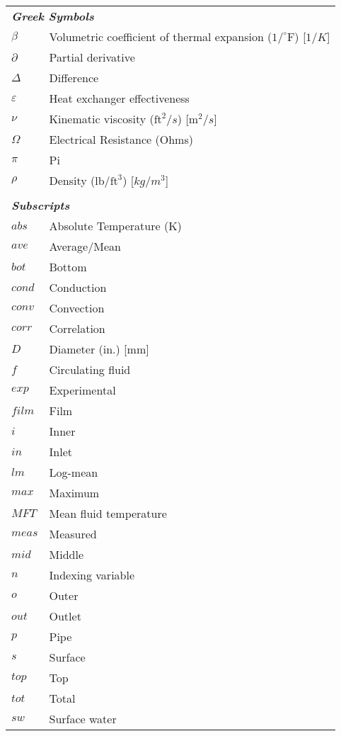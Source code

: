 \begin{nomenclature}
\begin{tabular}{p{2cm} p{12cm}}
		\multicolumn{2}{l}{\textbf{\textit{Greek Symbols}}} \\
		$\beta$ \dotfill & Volumetric coefficient of thermal expansion ($1/^\circ \mbox{F}$) [$1/K$]\\
		$\partial$ \dotfill & Partial derivative \\
		$\Delta$ \dotfill & Difference \\
		$\varepsilon$ \dotfill & Heat exchanger effectiveness \\
		$\nu$ \dotfill & Kinematic viscosity ($\mbox{ft}^2/s$) [$\mbox{m}^2/s$]\\
		$\Omega$ \dotfill & Electrical Resistance (Ohms)\\
		$\pi$ \dotfill & Pi \\
		$\rho$ \dotfill & Density (lb/$\mbox{ft}^3$) [$kg/m^3$]\\
		& \\
		\multicolumn{2}{l}{\textbf{\textit{Subscripts}}} \\
		$abs$ \dotfill & Absolute Temperature (K)\\
		$ave$ \dotfill & Average/Mean \\
		$bot$ \dotfill & Bottom \\
		$cond$ \dotfill & Conduction \\
		$conv$ \dotfill & Convection \\
		$corr$ \dotfill & Correlation \\
		$D$ \dotfill & Diameter (in.) [mm] \\
		$f$ \dotfill & Circulating fluid \\
		$exp$ \dotfill & Experimental \\
		$film$ \dotfill & Film \\
		$i$ \dotfill & Inner \\
		$in$ \dotfill & Inlet \\
		$lm$ \dotfill & Log-mean \\
		$max$ \dotfill & Maximum \\
		$MFT$ \dotfill & Mean fluid temperature \\
		$meas$ \dotfill & Measured \\
		$mid$ \dotfill & Middle \\
		$n$ \dotfill & Indexing variable \\
		$o$ \dotfill & Outer \\
		$out$ \dotfill & Outlet \\
		$p$ \dotfill & Pipe \\
		$s$ \dotfill & Surface \\
		$top$ \dotfill & Top \\
		$tot$ \dotfill & Total \\
		$sw$ \dotfill & Surface water\\	
	\end{tabular}

\end{nomenclature}

